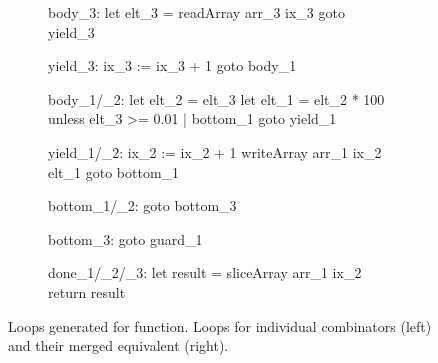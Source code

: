 \documentclass[preamble.tex]{subfiles}
\begin{document}
\begin{figure}
\begin{subfigure}{.45\textwidth}
\begin{loopcode}[%
    literate=
        {_1}{{\sub{map}}}3  %
        {_2}{{\sub{filt}}}2 %
        {_3}{{\sub{mfst}}}3 %
]
body_3:
  let elt_3 = readArray arr_3 ix_3
  goto yield_3

yield_3:
  ix_3 := ix_3 + 1
  goto body_1



body_1/_2:
  let elt_2 = elt_3
  let elt_1 = elt_2 * 100
  unless elt_3 >= 0.01 | bottom_1
  goto yield_1

yield_1/_2:
  ix_2 := ix_2 + 1
  writeArray arr_1 ix_2 elt_1
  goto bottom_1

bottom_1/_2:
  goto bottom_3



bottom_3:
  goto guard_1

done_1/_2/_3:
  let result = sliceArray arr_1 ix_2
  return result
\end{loopcode}
\end{subfigure}
\caption{Loops generated for  function. Loops for individual combinators (left) and their merged equivalent (right).}
\label{fig:toPercentages-loops}
\end{figure}
\end{document}
